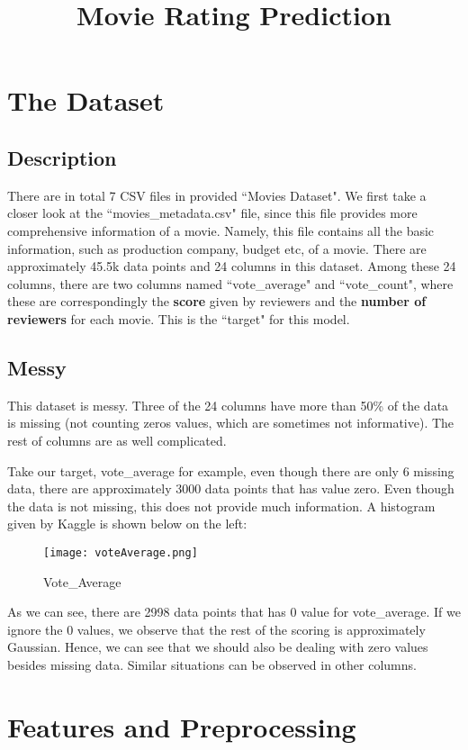 \documentclass[12pt]{article}
\title{\vspace{-2.0cm}Movie Rating Prediction}
\date{\vspace{-13ex}}
\begin{document}
\maketitle
\thispagestyle{fancy}
\section{The Dataset}
\subsection{Description}
There are in total 7 CSV files in provided ``Movies Dataset". We first take a closer look at the ``movies\_metadata.csv" file, since this file provides more comprehensive information of a movie. Namely, this file contains all the basic information, such as production company, budget etc, of a movie. There are approximately 45.5k data points and 24 columns in this dataset. Among these 24 columns, there are two columns named ``vote\_average" and ``vote\_count", where these are correspondingly the \textbf{score} given by reviewers and the \textbf{number of reviewers} for each movie. This is the ``target" for this model.
\subsection{Messy}
This dataset is messy. Three of the 24 columns have more than 50\% of the data is missing (not counting zeros values, which are sometimes not informative). The rest of columns are as well complicated. \par Take our target, vote\_average for example, even though there are only 6 missing data, there are approximately 3000 data points that has value zero. Even though the data is not missing, this does not provide much information. A histogram given by Kaggle is shown below on the left:
\begin{wrapfigure}{L}{0.4\textwidth}
\centering
\texttt{[image: voteAverage.png]}
\caption{Vote\_Average}
\end{wrapfigure}\par
As we can see, there are 2998 data points that has 0 value for vote\_average. If we ignore the 0 values, we observe that the rest of the scoring is approximately Gaussian. Hence, we can see that we should also be dealing with zero values besides missing data. Similar situations can be observed in other columns. 
\section{Features and Preprocessing}
\end{document}
